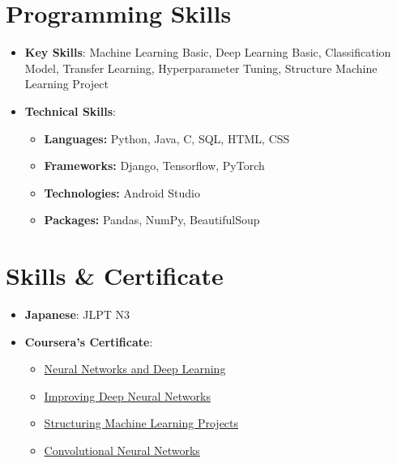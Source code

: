 \documentclass[letterpaper,11pt]{article}
\newcommand{\resumeSubHeadingListStart}{\begin{itemize}[leftmargin=*]}
\newcommand{\resumeSubHeadingListEnd}{\end{itemize}}
\begin{document}
\section{Programming Skills}
 \resumeSubHeadingListStart
   \item \textbf{Key Skills}{: Machine Learning Basic, Deep Learning Basic, Classification Model, Transfer Learning, Hyperparameter Tuning, Structure Machine Learning Project}
   \item \textbf{Technical Skills}{:}
    \begin{itemize}
   	 \item \textbf{Languages: }Python, Java, C, SQL, HTML, CSS
   	 \item \textbf{Frameworks: }Django, Tensorflow, PyTorch
   	 \item \textbf{Technologies: }Android Studio
   	 \item \textbf{Packages: }Pandas, NumPy, BeautifulSoup
   	\end{itemize}
 \resumeSubHeadingListEnd


\section{Skills \& Certificate}
 \resumeSubHeadingListStart
   \item \textbf{Japanese}{: JLPT N3}
   \item \textbf{Coursera's Certificate}{: }
   	\begin{itemize}
   	 \item \href{https://www.coursera.org/account/accomplishments/verify/3SV6ZM83PAPY}{Neural Networks and Deep Learning}
   	 \item \href{https://www.coursera.org/account/accomplishments/verify/K7R7RXN6Q7SV}{Improving Deep Neural Networks}
   	 \item \href{https://www.coursera.org/account/accomplishments/verify/LDATR4NBCUGX}{Structuring Machine Learning Projects}
   	 \item \href{https://www.coursera.org/account/accomplishments/verify/V5T79CX4DHVH}{Convolutional Neural Networks}
   	\end{itemize}
 \resumeSubHeadingListEnd


\end{document}

